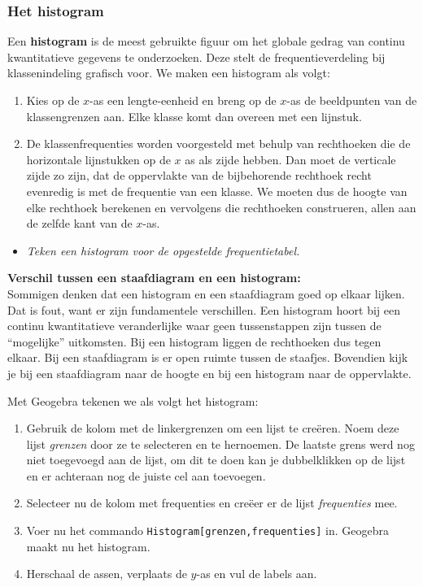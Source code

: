 \documentclass[11pt]{article}
\newcommand{\vraag}[2]{\begin{itemize}\item {\it #1} \vspace*{#2}\end{itemize}}
\begin{document}
\subsubsection{Het histogram}

Een {\bf histogram} is de meest gebruikte figuur om het globale gedrag van continu
kwantitatieve gegevens te onderzoeken. Deze stelt de frequentieverdeling bij klassenindeling
grafisch voor. We maken een histogram als volgt:

\begin{enumerate}
  \item Kies op de $x$-as een lengte-eenheid en breng op de $x$-as de beeldpunten van de klassengrenzen aan. Elke klasse komt dan overeen met een lijnstuk.
  \item De klassenfrequenties worden voorgesteld met behulp van rechthoeken die de horizontale lijnstukken op de $x$ as als zijde hebben. Dan moet de verticale zijde zo zijn, dat de oppervlakte van de bijbehorende rechthoek recht evenredig is met de frequentie van een klasse. We moeten dus de hoogte van elke rechthoek berekenen en vervolgens die rechthoeken construeren, allen aan de zelfde kant van de $x$-as.
\end{enumerate}

\vraag{Teken een histogram voor de opgestelde frequentietabel.}{0cm}

\begin{center}
  
\end{center}

{\bf Verschil tussen een staafdiagram en een histogram:}\\
Sommigen denken dat een histogram en een staafdiagram goed op elkaar
lijken. Dat is fout, want er zijn fundamentele verschillen. Een histogram hoort
bij een continu kwantitatieve veranderlijke waar geen tussenstappen zijn tussen
de “mogelijke” uitkomsten. Bij een histogram liggen de rechthoeken dus tegen
elkaar. Bij een staafdiagram is er open ruimte tussen de staafjes. Bovendien
kijk je bij een staafdiagram naar de hoogte en bij een histogram naar de
oppervlakte.

Met Geogebra tekenen we als volgt het histogram:
\begin{enumerate}
  \item Gebruik de kolom met de linkergrenzen om een lijst te creëren. Noem deze lijst {\it grenzen} door ze te selecteren en te hernoemen. De laatste grens werd nog niet toegevoegd aan de lijst, om dit te doen kan je dubbelklikken op de lijst en er achteraan nog de juiste cel aan toevoegen.
  \item Selecteer nu de kolom met frequenties en creëer er de lijst {\it frequenties} mee.
  \item Voer nu het commando \verb#Histogram[grenzen,frequenties]# in. Geogebra maakt nu het histogram.
  \item Herschaal de assen, verplaats de $y$-as en vul de labels aan.
\end{enumerate}
\end{document}
